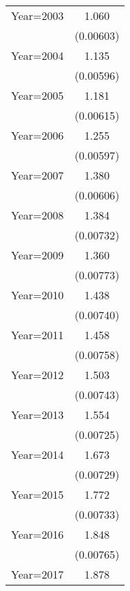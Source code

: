 {\begin{longtable}{l*{1}{c}}
\addlinespace
Year=2003           &       1.060\sym{***}\\
                    &   (0.00603)         \\
\addlinespace
Year=2004           &       1.135\sym{***}\\
                    &   (0.00596)         \\
\addlinespace
Year=2005           &       1.181\sym{***}\\
                    &   (0.00615)         \\
\addlinespace
Year=2006           &       1.255\sym{***}\\
                    &   (0.00597)         \\
\addlinespace
Year=2007           &       1.380\sym{***}\\
                    &   (0.00606)         \\
\addlinespace
Year=2008           &       1.384\sym{***}\\
                    &   (0.00732)         \\
\addlinespace
Year=2009           &       1.360\sym{***}\\
                    &   (0.00773)         \\
\addlinespace
Year=2010           &       1.438\sym{***}\\
                    &   (0.00740)         \\
\addlinespace
Year=2011           &       1.458\sym{***}\\
                    &   (0.00758)         \\
\addlinespace
Year=2012           &       1.503\sym{***}\\
                    &   (0.00743)         \\
\addlinespace
Year=2013           &       1.554\sym{***}\\
                    &   (0.00725)         \\
\addlinespace
Year=2014           &       1.673\sym{***}\\
                    &   (0.00729)         \\
\addlinespace
Year=2015           &       1.772\sym{***}\\
                    &   (0.00733)         \\
\addlinespace
Year=2016           &       1.848\sym{***}\\
                    &   (0.00765)         \\
\addlinespace
Year=2017           &       1.878\sym{***}\\

\end{longtable}}
